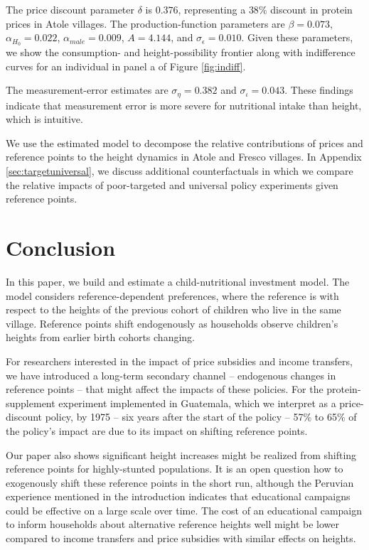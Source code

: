 The price discount parameter $\delta$ is $0.376$, representing a $38\%$ discount in protein prices in Atole villages. The production-function parameters are $\beta=0.073$, $\alpha_{H_0}=0.022$, $\alpha_{male}=0.009$, $A=4.144$, and $\sigma_{\epsilon}=0.010$. Given these parameters, we show the consumption- and height-possibility frontier along with indifference curves for an individual in panel a of Figure \ref{fig:indiff}.

The measurement-error estimates are $\sigma_{\eta}=0.382$ and $\sigma_{\iota}=0.043$. These findings indicate that measurement error is more severe for nutritional intake than height, which is intuitive.

We use the estimated model to decompose the relative contributions of prices and reference points to the height dynamics in Atole and Fresco villages. In Appendix \ref{sec:targetuniversal}, we discuss additional counterfactuals in which we compare the relative impacts of poor-targeted and universal policy experiments given reference points.


\section{Conclusion}

In this paper, we build and estimate a child-nutritional investment model. The model considers reference-dependent preferences, where the reference is with respect to the heights of the previous cohort of children who live in the same village. Reference points shift endogenously as households observe children’s heights from earlier birth cohorts changing.

For researchers interested in the impact of price subsidies and income transfers, we have introduced a long-term secondary channel -- endogenous changes in reference points -- that might affect the impacts of these policies. For the protein-supplement experiment implemented in Guatemala, which we interpret as a price-discount policy, by 1975 -- six years after the start of the policy – 57\% to 65\% of the policy’s impact are due to its impact on shifting reference points.

Our paper also shows significant height increases might be realized from shifting reference points for highly-stunted populations. It is an open question how to exogenously shift these reference points in the short run, although the Peruvian experience mentioned in the introduction indicates that educational campaigns could be effective on a large scale over time. The cost of an educational campaign to inform households about alternative reference heights well might be lower compared to income transfers and price subsidies with similar effects on heights.

